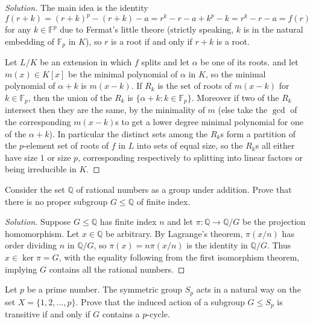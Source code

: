 \documentclass[10pt]{article}
\providecommand{\FF}{\mathbb F}
\providecommand{\QQ}{\mathbb Q}
\newenvironment{soln}{\begin{proof}[Solution]}{\end{proof}}
\begin{document}
\begin{soln}
    The main idea is the identity
    \begin{equation*}
        f(r + k) = (r+k)^p - (r+k) - a
	= r^k - r - a + k^p - k = r^k - r - a = f(r)
	\tag{$*$}
    \end{equation*}
    for any $k\in\FF^p$ due to Fermat's little theore
    (strictly speaking, $k$ is in the natural embedding of $\FF_p$ in $K$),
    so $r$ is a root if and only if $r+k$ is a root.

    Let $L/K$ be an extension in which $f$ splits
    and let $\alpha$ be one of its roots.
    and let $m(x)\in K[x]$ be the minimal polynomial of $\alpha$ in $K$,
    so the minimal polynomial of $\alpha + k$ is $m(x - k)$.
    If $R_k$ is the set of roots of $m(x-k)$ for $k\in\FF_p$,
    then the union of the $R_k$ is $\{\alpha + k : k\in\FF_p\}$.
    Moreover if two of the $R_k$ intersect then they are the same,
    by the minimality of $m$ (else take the $\gcd$ of the corresponding $m(x-k)$s
    to get a lower degree minimal polynomial for one of the $\alpha + k$).
    In particular the distinct sets among the $R_k$s
    form a partition of the $p$-element set of roots of $f$ in $L$
    into sets of equal size, so the $R_k$s all either have size $1$ or size $p$,
    corresponding respectively to splitting into linear factors
    or being irreducible in $K$.
\end{soln}

\begin{problem}
    Consider the set $\QQ$ of rational numbers as a group under addition.
    Prove that there is no proper subgroup $G\le\QQ$ of finite index.
\end{problem}

\begin{soln}
    Suppose $G\le\QQ$ has finite index $n$
    and let $\pi\colon\QQ\to\QQ/G$ be the projection homomorphism.
    Let $x\in\QQ$ be arbitrary.
    By Lagrange's theorem, $\pi(x/n)$ has order dividing $n$ in $\QQ/G$,
    so $\pi(x) = n\pi(x/n)$ is the identity in $\QQ/G$.
    Thus $x\in\ker\pi = G$, with the equality following from
    the first isomorphism theorem, implying $G$ contains all the rational numbers.
\end{soln}

\begin{problem}
    Let $p$ be a prime number. The symmetric group $S_p$
    acts in a natural way on the set $X = \{1, 2, \dots, p\}$.
    Prove that the induced action of a subgroup $G\le S_p$ is transitive
    if and only if $G$ contains a $p$-cycle.
\end{problem}
\end{document}
